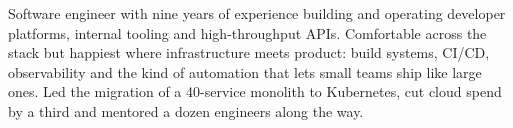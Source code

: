 

\begin{cvparagraph}

Software engineer with nine years of experience building and operating
developer platforms, internal tooling and high-throughput APIs. Comfortable
across the stack but happiest where infrastructure meets product: build
systems, CI/CD, observability and the kind of automation that lets small teams
ship like large ones. Led the migration of a 40-service monolith to
Kubernetes, cut cloud spend by a third and mentored a dozen engineers along
the way.

\end{cvparagraph}
